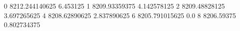 0 8212.244140625 6.453125
1 8209.93359375 4.142578125
2 8209.48828125 3.697265625
4 8208.62890625 2.837890625
6 8205.791015625 0.0
8 8206.59375 0.802734375
